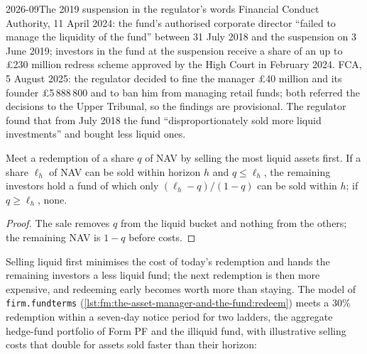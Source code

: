 \begin{dated}{2026-09}{The 2019 suspension in the regulator's words}\label{dat:fm:the-asset-manager-and-the-fund:weif}
Financial Conduct Authority, 11 April 2024: the fund's authorised corporate director ``failed to manage the liquidity of the fund'' between
31 July 2018 and the suspension on 3 June 2019; investors in the fund at the suspension receive a share of an up to £230 million redress scheme
approved by the High Court in February 2024. FCA, 5 August 2025: the regulator decided to fine the manager £40 million and its founder
£5\,888\,800 and to ban him from managing retail funds; both referred the decisions to the Upper Tribunal, so the findings are provisional. The
regulator found that from July 2018 the fund ``disproportionately sold more liquid investments'' and bought less liquid ones.
\end{dated}

\begin{proposition}\label{prop:fm:the-asset-manager-and-the-fund:liquidfirst}
Meet a redemption of a share $q$ of NAV by selling the most liquid assets first. If a share $\ell_h$ of NAV can be sold within horizon $h$ and
$q\le\ell_h$, the remaining investors hold a fund of which only $(\ell_h-q)/(1-q)$ can be sold within $h$; if $q\ge\ell_h$, none.
\end{proposition}

\begin{proof}
The sale removes $q$ from the liquid bucket and nothing from the others; the remaining NAV is $1-q$ before costs.
\end{proof}

Selling liquid first minimises the cost of today's redemption and hands the remaining investors a less liquid fund; the next redemption is then
more expensive, and redeeming early becomes worth more than staying. The model of \texttt{firm.fundterms} (\cref{lst:fm:the-asset-manager-and-the-fund:redeem})
meets a 30\% redemption within a seven-day notice period for two ladders, the aggregate hedge-fund portfolio of Form PF and the illiquid fund, with
illustrative selling costs that double for assets sold faster than their horizon:

